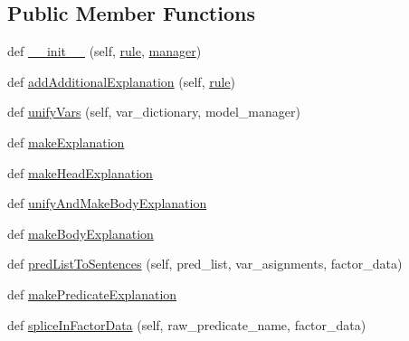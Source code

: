 \subsection*{Public Member Functions}
\begin{DoxyCompactItemize}
\item 
def \hyperlink{classexplanation__extractor_1_1_explanation_template_ae384db02e5b25f8a9da90b0554ea6459}{\+\_\+\+\_\+init\+\_\+\+\_\+} (self, \hyperlink{classexplanation__extractor_1_1_explanation_template_a4c4f2a6dd654e3aaa157970cc2c7bc21}{rule}, \hyperlink{classexplanation__extractor_1_1_explanation_template_a2f5ae7f61f258fd2d7d00aa9c21dcf39}{manager})
\item 
def \hyperlink{classexplanation__extractor_1_1_explanation_template_a1d4f9bb84ac2963aeea1208a8581f4a1}{add\+Additional\+Explanation} (self, \hyperlink{classexplanation__extractor_1_1_explanation_template_a4c4f2a6dd654e3aaa157970cc2c7bc21}{rule})
\item 
def \hyperlink{classexplanation__extractor_1_1_explanation_template_a6b8c95a94d1c6fc0abd092d70f6ac38a}{unify\+Vars} (self, var\+\_\+dictionary, model\+\_\+manager)
\item 
def \hyperlink{classexplanation__extractor_1_1_explanation_template_a4d5294a7b4df213aead6810020bcf5cf}{make\+Explanation}
\item 
def \hyperlink{classexplanation__extractor_1_1_explanation_template_a7de60c59f6bcb0557da1b1224efffca7}{make\+Head\+Explanation}
\item 
def \hyperlink{classexplanation__extractor_1_1_explanation_template_a86916fa50f74c7616a9f0cdb45cfe244}{unify\+And\+Make\+Body\+Explanation}
\item 
def \hyperlink{classexplanation__extractor_1_1_explanation_template_a0fbdf0b2b433f72519cecb10574e6049}{make\+Body\+Explanation}
\item 
def \hyperlink{classexplanation__extractor_1_1_explanation_template_aa64a3925b5b9ebc1f759b3eadc40df07}{pred\+List\+To\+Sentences} (self, pred\+\_\+list, var\+\_\+asignments, factor\+\_\+data)
\item 
def \hyperlink{classexplanation__extractor_1_1_explanation_template_a096ba3366ce13f3890f2329455c49908}{make\+Predicate\+Explanation}
\item 
def \hyperlink{classexplanation__extractor_1_1_explanation_template_a546a62509ffc27ffbb602dbd9a2c77b2}{splice\+In\+Factor\+Data} (self, raw\+\_\+predicate\+\_\+name, factor\+\_\+data)
\end{DoxyCompactItemize}
